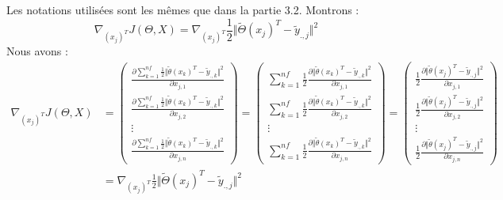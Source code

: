 \documentclass[a4paper,10pt]{article}
\begin{document}
\subsection{}  
\label{P1}
Les notations utilisées sont les mêmes que dans la partie 3.2. Montrons : \[\nabla_{(x_{j})^T} J(\Theta, X) = \nabla_{(x_{j})^T}\frac{1}{2}\Vert\tilde{\Theta}(x_{j})^{T}-\tilde{y}_{.,j}\Vert^{2}\]
Nous avons :
\begin{align*}
\nabla_{(x_{j})^T} J(\Theta, X) &=  
\begin{pmatrix}  
\displaystyle\frac{\partial \displaystyle\sum_{k=1}^{nf}\frac{1}{2}\Vert\tilde{\theta}(x_{k})^{T}-\tilde{y}_{.,k}\Vert^{2}}{\partial x_{j,1}}\\  
\displaystyle\frac{\partial \displaystyle\sum_{k=1}^{nf}\frac{1}{2}\Vert\tilde{\theta}(x_{k})^{T}-\tilde{y}_{.,k}\Vert^{2}}{\partial x_{j,2}}\\  
\vdots\\  
\displaystyle\frac{\partial \displaystyle\sum_{k=1}^{nf}\frac{1}{2}\Vert\tilde{\theta}(x_{k})^{T}-\tilde{y}_{.,k}\Vert^{2}}{\partial x_{j,n}}  
\end{pmatrix}  
=  
\begin{pmatrix}  
\displaystyle\sum_{k=1}^{nf}  
\frac{1}{2}\frac{\partial\Vert\tilde{\theta}(x_{k})^{T}-\tilde{y}_{.,k}\Vert^{2}}{\partial x_{j,1}}\\  
\displaystyle\sum_{k=1}^{nf}  
\frac{1}{2}\frac{\partial\Vert\tilde{\theta}(x_{k})^{T}-\tilde{y}_{.,k}\Vert^{2}}{\partial x_{j,2}}\\  
\vdots\\  
\displaystyle\sum_{k=1}^{nf}  
\frac{1}{2}\frac{\partial\Vert\tilde{\theta}(x_{k})^{T}-\tilde{y}_{.,k}\Vert^{2}}{\partial x_{j,n}}  
\end{pmatrix}  
=  
\begin{pmatrix}  
\displaystyle  
\frac{1}{2}\frac{\partial\Vert\tilde{\theta}(x_{j})^{T}-\tilde{y}_{.,j}\Vert^{2}}{\partial x_{j,1}}\\  
\displaystyle  
\frac{1}{2}\frac{\partial\Vert\tilde{\theta}(x_{j})^{T}-\tilde{y}_{.,j}\Vert^{2}}{\partial x_{j,2}}\\  
\vdots\\  
\displaystyle  
\frac{1}{2}\frac{\partial\Vert\tilde{\theta}(x_{j})^{T}-\tilde{y}_{.,j}\Vert^{2}}{\partial x_{j,n}}  
\end{pmatrix}\\
&=  
\displaystyle  
\nabla_{(x_{j})^T}\frac{1}{2}\Vert\tilde{\Theta}(x_{j})^{T}-\tilde{y}_{.,j}\Vert^{2}
\end{align*}\\
\end{document}

